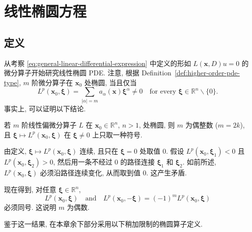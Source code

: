 \section{线性椭圆方程}\label{chap:linear-elliptic-equations}

\subsection{定义}\label{sec:elliptic-equation-definitions}

从考察 \eqref{eq:general-linear-differential-expression} 中定义的形如 $L(\bm{x},D)u=0$ 的微分算子开始研究线性椭圆 PDE. 注意, 根据 Definition~\ref{def:higher-order-pde-type}, $m$ 阶微分算子在 $\bm{x}_0$ 处椭圆, 当且仅当
\begin{equation}\label{eq:elliptic-opening-principal-symbol-nonzero}
L^p(\bm{x}_0,\bm{\xi})=\sum_{|\alpha|=m}a_\alpha(\bm{x})\bm{\xi}^\alpha\ne0\quad\text{for every }\bm{\xi}\in\mathbb{R}^n\backslash\{0\}.
\end{equation}
事实上, 可以证明以下结论.

\begin{Lemma}
\label{lem:elliptic-operator-even-order-fixed-sign}
若 $m$ 阶线性偏微分算子 $L$ 在 $\bm{x}_0\in\mathbb{R}^n$, $n>1$, 处椭圆, 则 $m$ 为偶整数 ($m=2k$), 且 $\bm{\xi}\mapsto L^p(\bm{x}_0,\bm{\xi})$ 在 $\bm{\xi}\ne0$ 上只取一种符号.
\end{Lemma}

\begin{Proof}
由定义, $\bm{\xi}\mapsto L^p(\bm{x}_0,\bm{\xi})$ 连续, 且只在 $\bm{\xi}=0$ 处取值 $0$. 假设 $L^p(\bm{x}_0,\bm{\xi}_1)<0$ 且 $L^p(\bm{x}_0,\bm{\xi}_2)>0$, 然后用一条不经过 $0$ 的路径连接 $\bm{\xi}_1$ 和 $\bm{\xi}_2$. 如前所述, $L^p(\bm{x}_0,\bm{\xi})$ 必须沿路径连续变化, 从而取到值 $0$. 这产生矛盾.

现在得到, 对任意 $\bm{\xi}\in\mathbb{R}^n$,\[L^p(\bm{x}_0,\bm{\xi})\quad\text{and}\quad L^p(\bm{x}_0,-\bm{\xi})=(-1)^mL^p(\bm{x}_0,\bm{\xi})\]必须同号. 这说明 $m$ 为偶数.
\end{Proof}

鉴于这一结果, 在本章余下部分采用以下稍加限制的椭圆算子定义.

